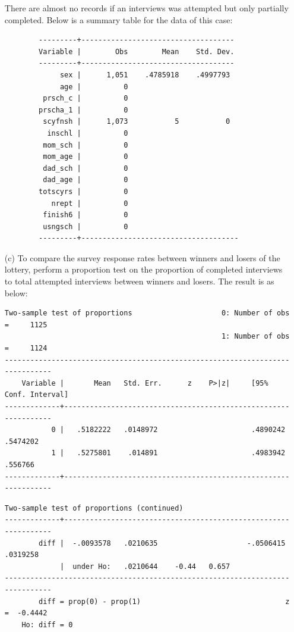 \documentclass{article}
\begin{document}
\begin{enumerate}
     There are almost no records if an interviews was attempted but only partially completed. Below is a summary table for the data of this case: 
     
        \begin{verbatim}
        ---------+------------------------------------
        Variable |        Obs        Mean    Std. Dev.
        ---------+------------------------------------
             sex |      1,051    .4785918    .4997793 
             age |          0
         prsch_c |          0
        prscha_1 |          0
         scyfnsh |      1,073           5           0
          inschl |          0
         mom_sch |          0
         mom_age |          0
         dad_sch |          0
         dad_age |          0
        totscyrs |          0
           nrept |          0
         finish6 |          0
         usngsch |          0
        ---------+-------------------------------------
        \end{verbatim}
    
    \item[(c)] To compare the survey response rates between winners and losers of the lottery, perform a proportion test on the proportion of completed interviews to total attempted interviews between winners and losers. The result is as below: 
    
\begin{verbatim}
Two-sample test of proportions                     0: Number of obs =     1125
                                                   1: Number of obs =     1124
------------------------------------------------------------------------------
    Variable |       Mean   Std. Err.      z    P>|z|     [95% Conf. Interval]
-------------+----------------------------------------------------------------
           0 |   .5182222   .0148972                      .4890242    .5474202
           1 |   .5275801    .014891                      .4983942     .556766
-------------+----------------------------------------------------------------
\end{verbatim}
\begin{verbatim}
Two-sample test of proportions (continued)
-------------+----------------------------------------------------------------
        diff |  -.0093578   .0210635                     -.0506415    .0319258
             |  under Ho:   .0210644    -0.44   0.657
------------------------------------------------------------------------------
        diff = prop(0) - prop(1)                                  z =  -0.4442
    Ho: diff = 0
\end{verbatim}
    

\end{enumerate}
\end{document}
